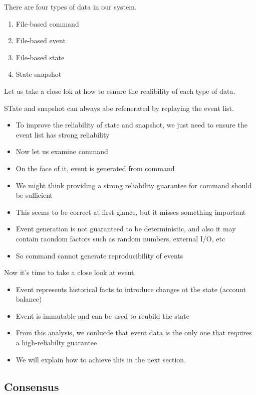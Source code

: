 \documentclass{report}
\theoremstyle{definition}
\let\oldsubsection\subsection
\renewcommand{\subsection}{\oldsubsection*}
\begin{document}
There are four types of data in our system.

\begin{enumerate}
\item
File-based command
\item
File-based event
\item
File-based state
\item
State snapshot
\end{enumerate}

Let us take a close lok at how to esnure the realibility of each type of data.

STate and snapshot can always abe refenerated by replaying the event list.

\begin{itemize}
\item
To improve the reliability of state and snapshot, we just need to ensure the event list has strong reliability
\item
Now let us examine command
\item
On the face of it, event is generated from command
\item
We might think providing a strong reliability guarantee for command should be sufficient
\item
This seems to be correct at first glance, but it misses something important
\item
Event generation is not guaranteed to be deterministic, and also it may contain raondom factors such as random numbers, external I/O, etc
\item
So command cannot generate reproducibility of events
\end{itemize}

Now it's time to take a close look at event.

\begin{itemize}
\item
Event represents historical facts to introduce changes ot the state (account balance)
\item
Event is immutable and can be used to reubild the state
\item
From this analysis, we conlucde that event data is the only one that requires a high-reliabilty guarantee
\item
We will explain how to achieve this in the next section.
\end{itemize}

\subsection{Consensus}
\end{document}
